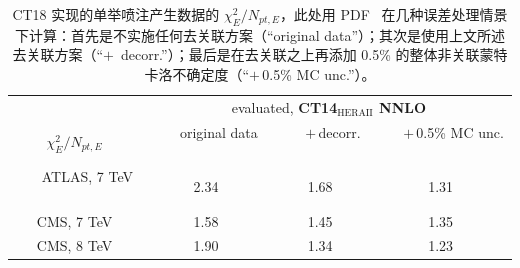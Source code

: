 \begin{table}[tb]
	\begin{tabular}{c|ccc}
		\hline
		\hline
        	&	\multicolumn{3}{c}{evaluated, {\bf CT14$_\mathrm{HERAII}$ NNLO}} 	\ \ \ \\
		\ \ \  $\chi^2_E/N_{pt,E}$ \ \ \	& \ \ \ original data \ \ \  &  \ \ \  $+$\,decorr. \ \ \    &  \ \ \  $+$\,0.5\% MC unc. \ \ \   \\
		\hline
		\ \ \ ATLAS, 7 TeV \ \ \   &  \ \ \  2.34 \ \ \   &  \ \ \  1.68 \ \ \   &  \ \ \  1.31 \ \ \   \\
		\ \ \ CMS, 7 TeV   \ \ \   &  \ \ \  1.58 \ \ \   &  \ \ \  1.45 \ \ \   &  \ \ \  1.35 \ \ \   \\
		\ \ \ CMS, 8 TeV   \ \ \   &  \ \ \  1.90 \ \ \   &  \ \ \  1.34 \ \ \   &  \ \ \  1.23 \ \ \   \\
		\hline
		\hline
	\end{tabular}
	\caption{CT18 实现的单举喷注产生数据的 $\chi^2_E/N_{pt,E}$，此处用 \CTHERAII{} PDF~\cite{Hou:2016nqm} 在几种误差处理情景下计算：首先是不实施任何去关联方案（``original data''）；其次是使用上文所述去关联方案（``$+$\, decorr.''）；最后是在去关联之上再添加 0.5\% 的整体非关联蒙特卡洛不确定度（``$+$\,0.5\% MC unc.''）。
	}
	\label{tab-chi}
\end{table}

